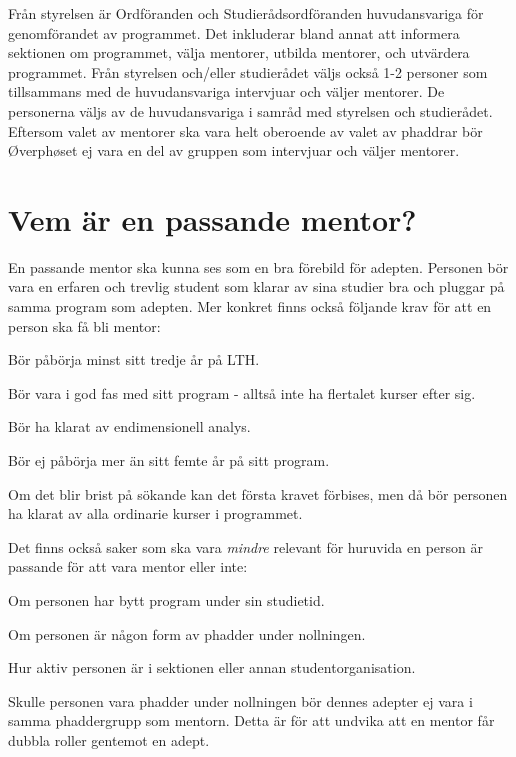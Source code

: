 \documentclass[10pt]{article}
\begin{document}
    Från styrelsen är Ordföranden och Studierådsordföranden huvudansvariga för genomförandet av programmet.
    Det inkluderar bland annat att informera sektionen om programmet, välja mentorer, utbilda mentorer, och utvärdera programmet.
    Från styrelsen och/eller studierådet väljs också 1-2 personer som tillsammans med de huvudansvariga intervjuar och väljer mentorer.
    De personerna väljs av de huvudansvariga i samråd med styrelsen och studierådet.
    Eftersom valet av mentorer ska vara helt oberoende av valet av phaddrar bör \O verph\o set ej vara en del av gruppen som intervjuar och väljer mentorer.

    \section{Vem är en passande mentor?}
    En passande mentor ska kunna ses som en bra förebild för adepten.
    Personen bör vara en erfaren och trevlig student som klarar av sina studier bra och pluggar på samma program som adepten.
    Mer konkret finns också följande krav för att en person ska få bli mentor:
    \begin{dashlist}
        \item Bör påbörja minst sitt tredje år på LTH.
        \item Bör vara i god fas med sitt program - alltså inte ha flertalet kurser efter sig.
        \item Bör ha klarat av endimensionell analys.
        \item Bör ej påbörja mer än sitt femte år på sitt program.
    \end{dashlist}

    Om det blir brist på sökande kan det första kravet förbises, men då bör personen ha klarat av alla ordinarie kurser i programmet.

    Det finns också saker som ska vara \emph{mindre} relevant för huruvida en person är passande för att vara mentor eller inte:
    \begin{dashlist}
        \item Om personen har bytt program under sin studietid.
        \item Om personen är någon form av phadder under nollningen.
        \item Hur aktiv personen är i sektionen eller annan studentorganisation.
    \end{dashlist}

    Skulle personen vara phadder under nollningen bör dennes adepter ej vara i samma phaddergrupp som mentorn.
    Detta är för att undvika att en mentor får dubbla roller gentemot en adept.
\end{document}
